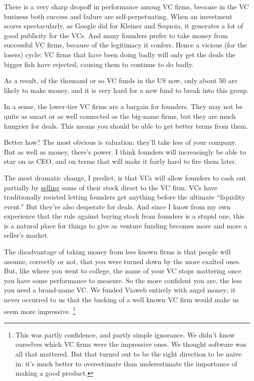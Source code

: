 There is a very sharp dropoff in performance among VC firms, because in
the VC business both success and failure are self-perpetuating. When an
investment scores spectacularly, as Google did for Kleiner and Sequoia,
it generates a lot of good publicity for the VCs. And many founders
prefer to take money from successful VC firms, because of the legitimacy
it confers. Hence a vicious (for the losers) cycle: VC firms that have
been doing badly will only get the deals the bigger fish have rejected,
causing them to continue to do badly.

As a result, of the thousand or so VC funds in the US now, only about 50
are likely to make money, and it is very hard for a new fund to break
into this group.

In a sense, the lower-tier VC firms are a bargain for founders. They may
not be quite as smart or as well connected as the big-name firms, but
they are much hungrier for deals. This means you should be able to get
better terms from them.

Better how? The most obvious is valuation: they'll take less of your
company. But as well as money, there's power. I think founders will
increasingly be able to stay on as CEO, and on terms that will make it
fairly hard to fire them later.

The most dramatic change, I predict, is that VCs will allow founders to
cash out partially by \href{vcsqueeze.html}{selling} some of their stock
direct to the VC firm. VCs have traditionally resisted letting founders
get anything before the ultimate ``liquidity event.'' But they're also
desperate for deals. And since I know from my own experience that the
rule against buying stock from founders is a stupid one, this is a
natural place for things to give as venture funding becomes more and
more a seller's market.

The disadvantage of taking money from less known firms is that people
will assume, correctly or not, that you were turned down by the more
exalted ones. But, like where you went to college, the name of your VC
stops mattering once you have some performance to measure. So the more
confident you are, the less you need a brand-name VC. We funded Viaweb
entirely with angel money; it never occurred to us that the backing of a
well known VC firm would make us seem more impressive.
\footnote{This was partly confidence, and partly simple ignorance. We
didn't know ourselves which VC firms were the impressive ones. We
thought software was all that mattered. But that turned out to be the
right direction to be naive in: it's much better to overestimate than
underestimate the importance of making a good product.}

